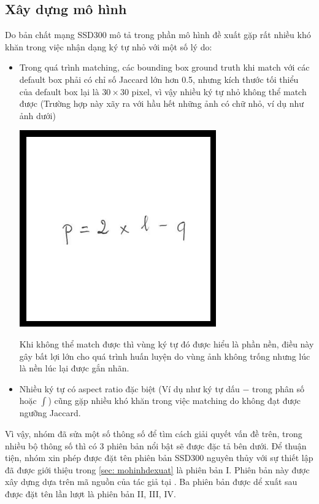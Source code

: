 \documentclass[a4paper,12pt]{article}
\begin{document}
	\newpage
	\subsection{Xây dựng mô hình}
	\label{subsec: xaydungmohinh}
	Do bản chất mạng SSD300\cite{liu2016ssd} mô tả trong phần mô hình đề xuất gặp rất nhiều khó khăn trong việc nhận dạng ký tự nhỏ với một số lý do:
	\begin{itemize}
		\item Trong quá trình matching, các bounding box ground truth khi match với các default box phải có chỉ số Jaccard\cite{Jaccard} lớn hơn 0.5, nhưng kích thước tối thiểu của default box lại là $30 \times 30$ pixel, vì vậy nhiều ký tự nhỏ không thể match được (Trường hợp này xãy ra với hầu hết những ảnh có chữ nhỏ, ví dụ như ảnh dưới)
		\begin{center}
			\centering
			\includegraphics[resolution=300]{HMER_2017_TEST1_MINH_01_2A.png}
			\vspace{0.5cm}
		\end{center}
		Khi không thể match được thì vùng ký tự đó được hiểu là phần nền, điều này gây bất lợi lớn cho quá trình huấn luyện do vùng ảnh không trống nhưng lúc là nền lúc lại được gắn nhãn.
		
		\item Nhiều ký tự có aspect ratio đặc biệt (Ví dụ như ký tự dấu $-$ trong phân số hoặc $\int$) cũng gặp nhiều khó khăn trong việc matching do không đạt được ngưỡng Jaccard\cite{Jaccard}.
	\end{itemize}
	Vì vậy, nhóm đã sửa một số thông số để tìm cách giải quyết vấn đề trên, trong nhiều bộ thông số thì có 3 phiên bản nổi bật sẽ được đặc tả bên dưới. Để thuận tiện, nhóm xin phép được đặt tên phiên bản SSD300 nguyên thủy\cite{liu2016ssd} với sự thiết lập đã được giới thiệu trong \ref{sec: mohinhdexuat} là phiên bản I. Phiên bản này được xây dựng dựa trên mã nguồn của tác giả tại \cite{github}. Ba phiên bản được dể xuất sau được đặt tên lần lượt là phiên bản II, III, IV.
	
\end{document}
